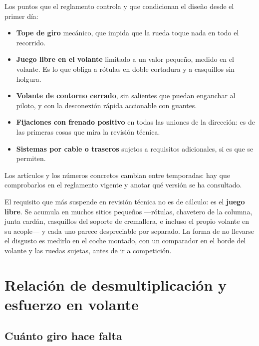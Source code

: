 \begin{regla}[dirección]
Los puntos que el reglamento controla y que condicionan el diseño desde el
primer día:

\begin{itemize}
  \item \textbf{Tope de giro} mecánico, que impida que la rueda toque nada en
        todo el recorrido.
  \item \textbf{Juego libre en el volante} limitado a un valor pequeño, medido
        en el volante. Es lo que obliga a rótulas en doble cortadura y a
        casquillos sin holgura.
  \item \textbf{Volante de contorno cerrado}, sin salientes que puedan enganchar
        al piloto, y con la desconexión rápida accionable con guantes.
  \item \textbf{Fijaciones con frenado positivo} en todas las uniones de la
        dirección: es de las primeras cosas que mira la revisión técnica.
  \item \textbf{Sistemas por cable o traseros} sujetos a requisitos adicionales,
        si es que se permiten.
\end{itemize}

Los artículos y los números concretos cambian entre temporadas: hay que
comprobarlos en el reglamento vigente y anotar qué versión se ha consultado.
\end{regla}

\begin{ojo}
El requisito que más suspende en revisión técnica no es de cálculo: es el
\textbf{juego libre}. Se acumula en muchos sitios pequeños ---rótulas, chavetero
de la columna, junta cardán, casquillos del soporte de cremallera, e incluso el
propio volante en su acople--- y cada uno parece despreciable por separado.
La forma de no llevarse el disgusto es medirlo en el coche montado, con un
comparador en el borde del volante y las ruedas sujetas, antes de ir a
competición.
\end{ojo}

\section{Relación de desmultiplicación y esfuerzo en volante}
\label{sec:direccion:02}

\subsection{Cuánto giro hace falta}

